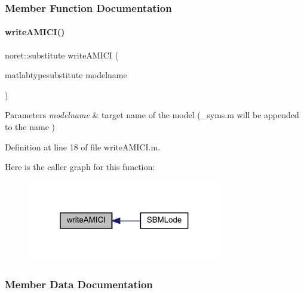 \subsubsection{Member Function Documentation}
\mbox{\label{class_s_b_m_lode_af2ebf8afc99040060a0af5b3ec3632a7}} 
\paragraph{\texorpdfstring{write\+A\+M\+I\+C\+I()}{writeAMICI()}}
{\footnotesize\ttfamily noret\+::substitute write\+A\+M\+I\+CI (\begin{DoxyParamCaption}\item[{matlabtypesubstitute}]{modelname }\end{DoxyParamCaption})}


\begin{DoxyParams}{Parameters}
{\em modelname} & target name of the model (\+\_\+syms.\+m will be appended to the name ) \\
\hline
\end{DoxyParams}


Definition at line 18 of file write\+A\+M\+I\+C\+I.\+m.

Here is the caller graph for this function\+:\nopagebreak
\begin{figure}[H]
\begin{center}
\leavevmode
\includegraphics[width=241pt]{class_s_b_m_lode_af2ebf8afc99040060a0af5b3ec3632a7_icgraph}
\end{center}
\end{figure}


\subsubsection{Member Data Documentation}
\mbox{\label{class_s_b_m_lode_adc6e5733fc3c22f0a7b2914188c49c90}} 
